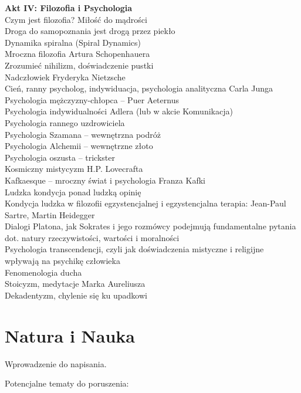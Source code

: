 \documentclass[]{coda-art}
\begin{document}
\textbf{Akt IV: Filozofia i Psychologia} \\
Czym jest filozofia? Miłość do mądrości \\
Droga do samopoznania jest drogą przez piekło \\
Dynamika spiralna (Spiral Dynamics) \\
Mroczna filozofia Artura Schopenhauera \\
Zrozumieć nihilizm, doświadczenie pustki \\
Nadczłowiek Fryderyka Nietzsche \\
Cień, ranny psycholog, indywiduacja, psychologia analityczna Carla Junga \\
Psychologia mężczyzny-chłopca -- Puer Aeternus \\
Psychologia indywidualności Adlera (lub w akcie Komunikacja) \\
Psychologia rannego uzdrowiciela \\
Psychologia Szamana -- wewnętrzna podróż \\
Psychologia Alchemii -- wewnętrzne złoto \\
Psychologia oszusta -- trickster \\
Kosmiczny mistycyzm H.P. Lovecrafta \\
Kafkaesque -- mroczny świat i psychologia Franza Kafki \\
Ludzka kondycja ponad ludzką opinię \\
Kondycja ludzka w filozofii egzystencjalnej i egzystencjalna terapia: Jean-Paul Sartre, Martin Heidegger \\
Dialogi Platona, jak Sokrates i jego rozmówcy podejmują fundamentalne pytania dot. natury rzeczywistości, wartości i moralności \\
Psychologia transcendencji, czyli jak doświadczenia mistyczne i religijne wpływają na psychikę człowieka \\
Fenomenologia ducha \\
Stoicyzm, medytacje Marka Aureliusza \\
Dekadentyzm, chylenie się ku upadkowi



\clearpage\part{Natura i Nauka}
\label{akt:natura}

Wprowadzenie do napisania.

\vin Potencjalne tematy do poruszenia: 
\end{document}
